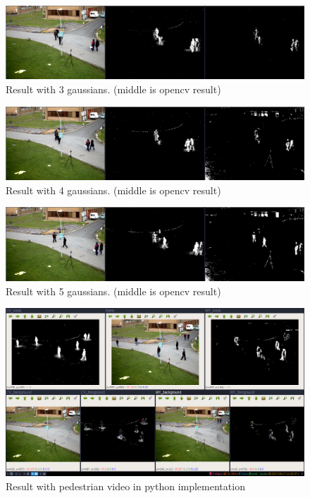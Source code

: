 \documentclass[12pt]{article}
\begin{document}
\begin{figure}
    \includegraphics[width=\linewidth]{images/3/2017-09-18_03-43-01-1363x336.png}
    \caption{Result with 3 gaussians. (middle is opencv result)}
    \label{fig:boat1}
\end{figure}

\begin{figure}
    \includegraphics[width=\linewidth]{images/4/2017-09-18_03-36-54-1362x337.png}
    \caption{Result with 4 gaussians. (middle is opencv result)}
    \label{fig:boat1}
\end{figure}

\begin{figure}
    \includegraphics[width=\linewidth]{images/5/2017-09-18_03-33-02-1363x338.png}
    \caption{Result with 5 gaussians. (middle is opencv result)}
    \label{fig:boat1}
\end{figure}

\begin{figure}
    \includegraphics[width=\linewidth]{images/python/2017-09-17_14-26-58-1366x768.png}
    \caption{Result with pedestrian video in python implementation}
    \label{fig:boat1}
\end{figure}
\end{document}
